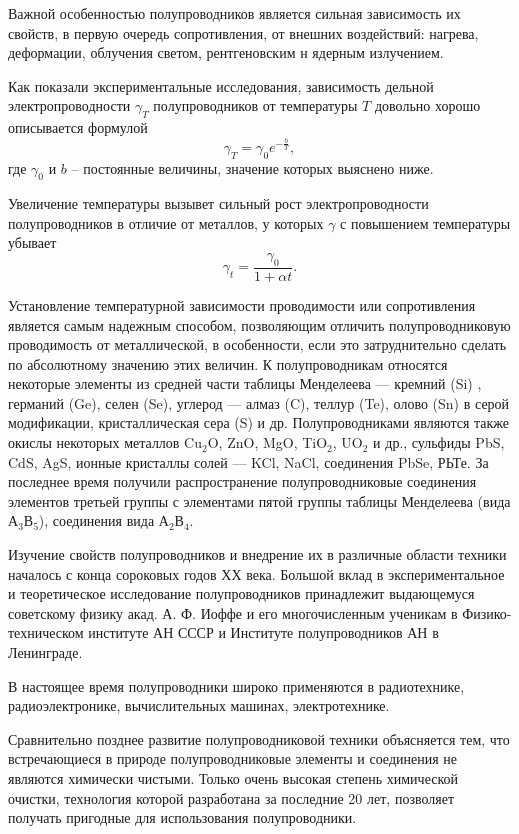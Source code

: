 \documentclass[a4paper,10pt]{book}
\begin{document}
Важной особенностью полупроводников является сильная зависимость их свойств, в первую очередь сопротивления, от внешних воздействий: нагрева, деформации, облучения светом, рентгеновским н ядерным излучением.

Как показали экспериментальные исследования, зависимость дельной электропроводности $\gamma_T$ полупроводников от температуры $T$ довольно хорошо описывается формулой\begin{equation}\label{25.1}
\gamma_T = \gamma_0 e^{-\frac{b}{T}},
\end{equation}
где $\gamma_0$ и $b$ -- постоянные величины, значение которых выяснено ниже.

Увеличение температуры вызывет сильный рост электропроводности полупроводников в отличие от металлов, у которых $\gamma$ с повышением температуры убывает\begin{equation*}
\gamma_t = \frac{\gamma_0}{1+\alpha t}.
\end{equation*}

Установление температурной зависимости проводимости или сопротивления является самым надежным способом, позволяющим отличить полупроводниковую проводимость от металлической, в особенности, если это затруднительно сделать по абсолютному значению этих величин. К полупроводникам относятся некоторые элементы из средней части таблицы Менделеева — кремний (Si) , германий (Ge), селен (Se), углерод — алмаз (C), теллур (Te), олово (Sn) в серой модификации, кристаллическая сера (S) и др. Полупроводниками являются также окислы некоторых металлов  Cu$_2$O, ZnO, MgO, TiO$_2$, UO$_2$ и др., сульфиды PbS, CdS, AgS, ионные  кристаллы солей — KCl, NaCl, соединения PbSe, РЬТе. За последнее время получили распространение полупроводниковые соединения элементов третьей группы с элементами пятой группы таблицы Менделеева (вида А$_3$В$_5$), соединения вида А$_2$В$_4$.

Изучение свойств полупроводников и внедрение их в различные области техники началось с конца сороковых годов ХХ века. Большой вклад в экспериментальное и теоретическое исследование полупроводников принадлежит выдающемуся советскому физику акад. А. Ф. Иоффе и его многочисленным ученикам в Физико-техническом институте АН СССР и Институте полупроводников АН в Ленинграде.

В настоящее время полупроводники широко применяются в радиотехнике, радиоэлектронике, вычислительных машинах, электротехнике.

Сравнительно позднее развитие полупроводниковой техники объясняется тем, что встречающиеся в природе полупроводниковые элементы и соединения не являются химически чистыми. Только очень высокая степень химической очистки, технология которой разработана за последние 20 лет, позволяет получать пригодные для использования полупроводники.
\end{document}

